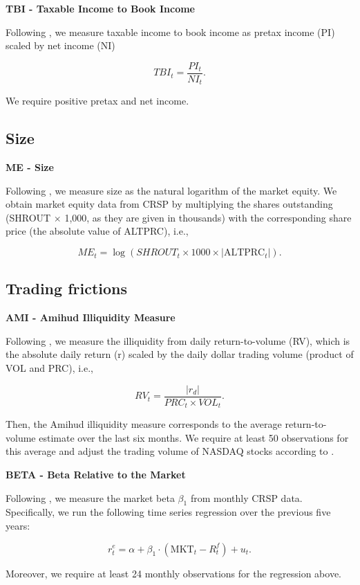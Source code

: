 \documentclass[
  article]{jss}
\begin{document}
\textbf{TBI - Taxable Income to Book Income}

Following \citet{lev.2004}, we measure taxable income to book income as
pretax income (PI) scaled by net income (NI)

\[
TBI_{t} = \frac{PI_{t}}{NI_{t}}\text{.}
\]

We require positive pretax and net income.

\subsection{Size}\label{size}

\textbf{ME - Size}

Following \citet{fama.1992}, we measure size as the natural logarithm of
the market equity. We obtain market equity data from CRSP by multiplying
the shares outstanding (SHROUT \(\times\) 1,000, as they are given in
thousands) with the corresponding share price (the absolute value of
ALTPRC), i.e.,

\[
ME_{t} = \log\left(SHROUT_{t} \times 1000 \times |\text{ALTPRC}_{t}|\right)\text{.}
\]

\subsection{Trading frictions}\label{trading-frictions}

\textbf{AMI - Amihud Illiquidity Measure}

Following \citet{amihud.2002}, we measure the illiquidity from daily
return-to-volume (RV), which is the absolute daily return (r) scaled by
the daily dollar trading volume (product of VOL and PRC), i.e.,

\[
RV_{t} = \frac{|r_{d}|}{PRC_{t} \times VOL_{t}}\text{.}
\]

Then, the Amihud illiquidity measure corresponds to the average
return-to-volume estimate over the last six months. We require at least
50 observations for this average and adjust the trading volume of NASDAQ
stocks according to \citet{gao.2010}.

\textbf{BETA - Beta Relative to the Market}

Following \citet{fama.1973}, we measure the market beta \(\beta_{1}\)
from monthly CRSP data. Specifically, we run the following time series
regression over the previous five years:

\[
r_{t}^{e} = \alpha + \beta_{1} \cdot (\text{MKT}_{t} - R_{t}^{f}) + u_{t}\text{.}
\]

Moreover, we require at least 24 monthly observations for the regression
above.
\end{document}
